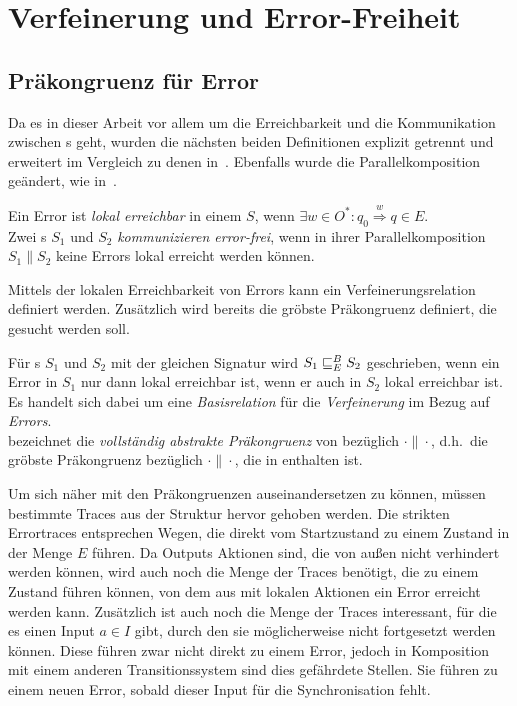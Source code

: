 \chapter{Verfeinerung und Error-Freiheit}

\section{Präkongruenz für Error}

Da es in dieser Arbeit vor allem um die Erreichbarkeit und die Kommunikation
zwischen \EIO{}s geht, wurden die nächsten beiden Definitionen explizit
getrennt und erweitert im Vergleich zu denen in~\cite{Vogler2014EIO}. Ebenfalls
wurde die Parallelkomposition geändert, wie in~\cite{Schlosser2012BA}.

\begin{Def}
  Ein Error ist \emph{lokal erreichbar} in einem \EIO{} $S$, wenn $\exists w\in O^*: q_0
  \overset{w}{\Rightarrow} q\in E$.\\
  Zwei \EIO{}s $S_1$ und $S_2$ \emph{kommunizieren error-frei}, wenn in ihrer
  Parallelkomposition $S_1\| S_2$ keine Errors lokal erreicht werden können.
\end{Def}

Mittels der lokalen Erreichbarkeit von Errors kann ein
Verfeinerungsrelation definiert werden. Zusätzlich wird bereits die
gröbste Präkongruenz definiert, die gesucht werden soll.

\begin{Def}
  \label{DefErrorBasisrel}
  Für \EIO{}s $S_1$ und $S_2$ mit der gleichen Signatur wird
  $S_1\sqsubseteq _E^B S_2$ geschrieben, wenn ein Error in $S_1$ nur dann lokal erreichbar ist, wenn er
  auch in $S_2$ lokal erreichbar ist. Es handelt sich dabei um eine
  \emph{Basisrelation} für die \emph{Verfeinerung} im Bezug auf \emph{Errors}.\\
  \ECRel{} bezeichnet die \emph{vollständig abstrakte Präkongruenz} von \EBRel{}
  bezüglich $\cdot\|\cdot$, d.h.\ die gröbste Präkongruenz bezüglich
  $\cdot\|\cdot$, die in \EBRel{} enthalten ist.
\end{Def}

Um sich näher mit den Präkongruenzen auseinandersetzen zu können, müssen bestimmte Traces
aus der Struktur hervor gehoben werden. Die strikten Errortraces entsprechen Wegen, die
direkt vom Startzustand zu einem Zustand in der Menge $E$ führen. Da Outputs Aktionen
sind, die von außen nicht verhindert werden können, wird auch noch die
Menge der Traces benötigt, die zu einem Zustand führen können, von dem aus mit lokalen Aktionen
ein Error erreicht werden kann. Zusätzlich ist auch noch die Menge der Traces
interessant, für die es einen Input $a\in I$ gibt, durch den sie möglicherweise nicht
fortgesetzt werden können. Diese führen zwar nicht direkt zu einem Error,
jedoch in Komposition mit einem anderen Transitionssystem sind
dies gefährdete Stellen. Sie führen zu einem neuen Error, sobald dieser Input
für die Synchronisation fehlt.

